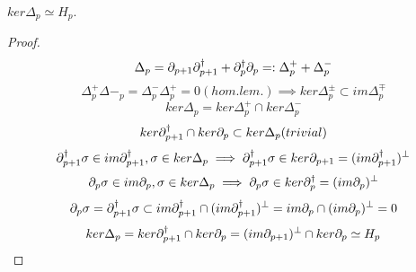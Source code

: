 \documentclass[../1.tex]{subfiles}
\begin{document}
    \begin{thm}
        $ker\Delta_p \simeq H_p$.
    \end{thm}
    \begin{proof}
        \[ \Delta_p = \partial_{p+1}\partial^\dagger_{p+1} + \partial^\dagger_p\partial_p =: \Delta^+_p + \Delta^-_p\]
        \[  \Delta^+_p\Delta-_p = \Delta^-_p\Delta^+_p = 0 (hom.lem.) \implies ker\Delta^{\pm}_p \subset im\Delta^{\mp}_p  \]
        \[ ker\Delta_p = ker\Delta^+_p \cap ker\Delta^-_p \]
        \[ ker\partial^\dagger_{p+1} \cap ker\partial_p \subset ker\Delta_p(trivial) \]
        \[ \partial^\dagger_{p+1}\sigma \in im\partial^\dagger_{p+1},\sigma \in ker\Delta_p \implies \partial^\dagger_{p+1}\sigma \in ker\partial_{p+1} = (im\partial^\dagger_{p+1})^\perp\]
        \[ \partial_p\sigma \in im\partial_p,\sigma \in ker\Delta_p \implies \partial_p\sigma \in ker\partial^\dagger_p= (im\partial_p)^\perp\]
        \[ \partial_p\sigma = \partial^\dagger_{p+1}\sigma \subset im\partial^\dagger_{p+1} \cap (im\partial^\dagger_{p+1})^\perp = im\partial_p \cap (im\partial_p)^\perp = 0\]
        \[ ker\Delta_p = ker\partial^\dagger_{p+1} \cap ker\partial_p = (im\partial_{p+1})^\perp \cap ker\partial_p \simeq H_p\]
    \end{proof}
    \cite{DEC}
\end{document}
